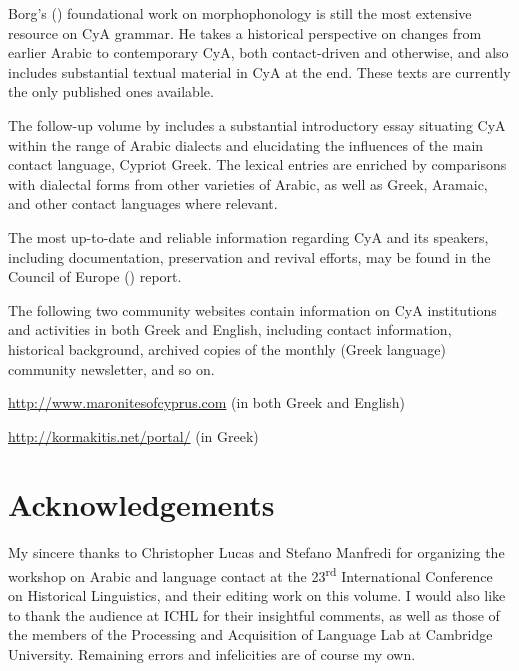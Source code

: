 \documentclass[output=paper]{langsci/langscibook}
\begin{document}
Borg's (\citeyear{Borg1985}) foundational work on morphophonology is still the most extensive resource on CyA grammar. He takes a historical perspective on changes from earlier Arabic to contemporary CyA, both contact-driven and otherwise, and also includes substantial textual material in CyA at the end. These texts are currently the only published ones available. 

The follow-up volume by \citet{Borg2004} includes a substantial introductory essay situating CyA within the range of Arabic dialects and elucidating the influences of the main contact language, Cypriot Greek. The lexical entries are enriched by comparisons with dialectal forms from other varieties of Arabic, as well as Greek, Aramaic, and other contact languages where relevant.  

The most up-to-date and reliable information regarding CyA and its speakers, including documentation, preservation and revival efforts, may be found in the Council of Europe (\citeyear{CouncilofEurope2017}) report. 

The following two community websites contain information on CyA institutions and activities in both Greek and English, including contact information, historical background, archived copies of the monthly (Greek language) community newsletter, and so on.

\url{http://www.maronitesofcyprus.com} (in both Greek and English)

\url{http://kormakitis.net/portal/} (in Greek)


 

\section*{Acknowledgements}
My sincere thanks to Christopher Lucas and Stefano Manfredi for organizing the workshop on Arabic and language contact at the 23\textsuperscript{rd} International Conference on Historical Linguistics, and their editing work on this volume. I would also like to thank the audience at ICHL for their insightful comments, as well as those of the members of the Processing and Acquisition of Language Lab at Cambridge University. Remaining errors and infelicities are of course my own. 
\end{document}
